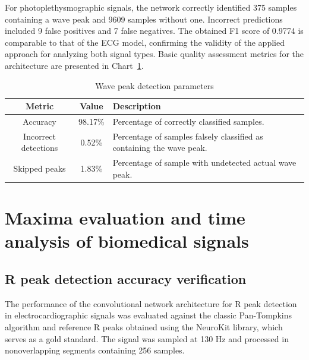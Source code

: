 \documentclass[journal]{IEEEtran}
\begin{document}
For photoplethysmographic signals, the network correctly identified 375 samples containing a wave peak and 9609 samples without one. Incorrect predictions included 9 false positives and 7 false negatives. The obtained F1 score of 0.9774 is comparable to that of the ECG model, confirming the validity of the applied approach for analyzing both signal types. Basic quality assessment metrics for the architecture are presented in Chart~\ref{tab:metrics_ppg}.

\begin{table}[ht]
\centering
\caption{Wave peak detection parameters}
\label{tab:metrics_ppg}
\begin{tabular}{|c|c|p{4.6cm}|}
\hline
\textbf{Metric} & \textbf{Value} & \textbf{Description} \\
\hline
Accuracy & 98.17\% & Percentage of correctly classified samples. \\
Incorrect detections & 0.52\% & Percentage of samples falsely classified as containing the wave peak. \\
Skipped peaks & 1.83\% & Percentage of sample with undetected actual wave peak. \\
\hline
\end{tabular}
\end{table}

\newpage
\section{Maxima evaluation and time analysis of biomedical signals}
\subsection{R peak detection accuracy verification}
The performance of the convolutional network architecture for R peak detection in electrocardiographic signals was evaluated against the classic Pan-Tompkins algorithm and reference R peaks obtained using the NeuroKit library, which serves as a gold standard. The signal was sampled at 130 Hz and processed in nonoverlapping segments containing 256 samples.
\end{document}
